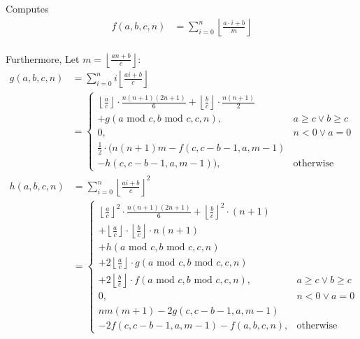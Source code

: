 Computes
  $$ \begin{aligned}
    f(a, b, c, n) &= \sum^{n}_{i=0} \left\lfloor \frac{a \cdot i + b}{m} \right\rfloor \\
  \end{aligned} $$

Furthermore, Let $m = \left\lfloor\frac{an + b}{c}\right\rfloor$:
  $$ \begin{aligned}
    g(a, b, c, n) &= \sum_{i = 0}^{n}i\left\lfloor\frac{ai + b}{c}\right\rfloor \\
    &= \begin{cases}
        \left\lfloor{\frac{a}{c}}\right\rfloor \cdot \frac{n(n + 1)(2n + 1)}{6} + \left\lfloor\frac{b}{c}\right\rfloor \cdot \frac{n(n + 1)}{2} \\ + g(a\text{ mod } c, b\text{ mod } c, c, n), & a \geq c \lor b \geq c \\
      0, & n < 0 \lor a = 0 \\
      \frac{1}{2} \cdot (n(n + 1)m - f(c, c - b - 1, a, m - 1) \\ - h(c, c - b - 1, a, m - 1)), & \text{otherwise}
    \end{cases}
  \end{aligned} $$
  $$ \begin{aligned}
    h(a, b, c, n) &= \sum_{i = 0}^{n}\left\lfloor\frac{ai + b}{c}\right\rfloor^2 \\
    &= \begin{cases}
        \left\lfloor\frac{a}{c}\right\rfloor^2 \cdot \frac{n(n + 1)(2n + 1)}{6} + \left\lfloor\frac{b}{c}\right\rfloor^2 \cdot (n + 1) \\ + \left\lfloor\frac{a}{c}\right\rfloor \cdot \left\lfloor\frac{b}{c}\right\rfloor \cdot n(n + 1) \\ + h(a\text{ mod } c, b\text{ mod } c, c, n) \\ + 2\left\lfloor\frac{a}{c}\right\rfloor \cdot g(a\text{ mod } c, b\text{ mod } c, c, n) \\ + 2\left\lfloor\frac{b}{c}\right\rfloor \cdot f(a\text{ mod } c, b\text{ mod } c, c, n), & a \geq c \lor b \geq c \\
      0, & n < 0 \lor a = 0 \\
      nm(m + 1) - 2g(c, c - b - 1, a, m - 1) \\ - 2f(c, c - b - 1, a, m - 1) - f(a, b, c, n), & \text{otherwise}
    \end{cases}
  \end{aligned} $$
  
  